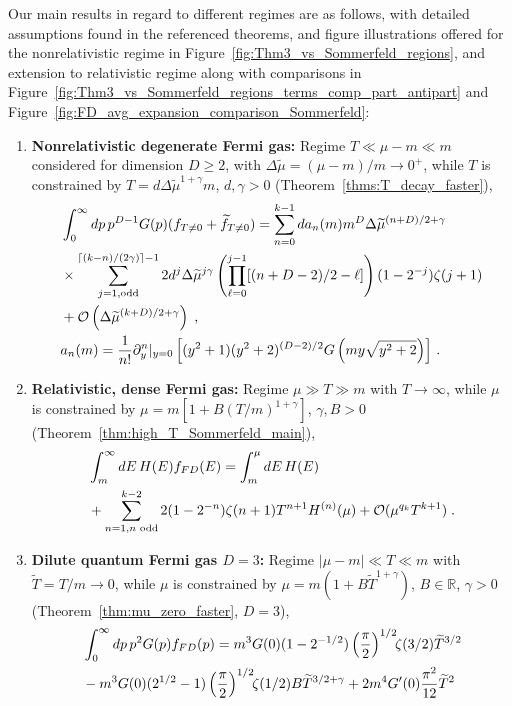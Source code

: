 \documentclass[sn-mathphys,Numbered]{sn-jnl}
\newcommand{\rf}[1]{Figure~{\ref{#1}}}
\newcommand{\rTh}[1]{Theorem~{\ref{#1}}}
\begin{document}
 Our main results in regard to different regimes are as follows, with detailed assumptions found in the referenced theorems, and figure illustrations offered for the nonrelativistic regime in \rf{fig:Thm3_vs_Sommerfeld_regions},  and extension to relativistic regime along with comparisons in \rf{fig:Thm3_vs_Sommerfeld_regions_terms_comp_part_antipart} and \rf{fig:FD_avg_expansion_comparison_Sommerfeld}:
\begin{enumerate}
\item 
{\bf Nonrelativistic degenerate Fermi gas:} Regime $T\ll\mu-m\ll m$ considered for dimension $D\geq 2$, with  $\Delta\widetilde{\mu}=(\mu-m)/m\to 0^+$, while $T$ is constrained by   $T=d\Delta\widetilde{\mu}^{1+\gamma}m$,  $d,\gamma>0$ (\rTh{thms:T_decay_faster}),
\begin{align}
 &\int_0^\infty dp\, p^{D-1} G(p)(f_{T\neq 0}+\widetilde{f}_{T\neq 0})=\sum_{n=0}^{k-1} da_n(m)m^{D}\Delta\widetilde{\mu}^{(n+D)/2+\gamma}\\
 &\times\sum_{j=1,\mathrm{odd}}^{\lceil(k-n)/(2\gamma)\rceil-1}
 2d^j\Delta\widetilde{\mu}^{j\gamma}\left(\prod_{\ell=0}^{j-1}[(n+D-2)/2-\ell] \right)(1-2^{-j})\zeta(j+1) \notag\\
 &+\mathcal{O}\left(\Delta\widetilde{\mu}^{(k+D)/2+\gamma}\right)\;,\notag\\
&a_n(m)=\frac{1}{n!}\partial_y^n|_{y=0}\left[ (y^2+1)( y^2+2)^{(D-2)/2} G\left(my\sqrt{y^2+2}\right)\right]\,.
\end{align}
\item  
{\bf Relativistic, dense Fermi gas:} Regime $\mu\gg T\gg m$ with  $T\to\infty$, while $\mu$ is constrained by $\mu=m[1+B(T/m)^{1+\gamma}]$, $\gamma,B>0$ (\rTh{thm:high_T_Sommerfeld_main}),
\begin{align}
 &\int_m^\infty dE\, H(E)f_{FD}(E)=\int_m^\mu dE\, H(E)\\
&+\sum_{n=1,n\text{ odd}}^{k-2} 2(1-2^{-n})\zeta(n+1)T^{n+1}H^{(n)}(\mu)+\mathcal{O}(\mu^{q_k}T^{k+1})\;.\notag
\end{align} 
\item  
{\bf Dilute quantum  Fermi gas $D=3$:} Regime $|\mu-m|\ll T\ll m$ with $\widetilde T=T/m\to 0$, while $\mu$ is constrained by  $\mu=m(1+B\widetilde{T}^{1+\gamma})$, $B\in\mathbb{R}$, $\gamma>0$ (\rTh{thm:mu_zero_faster}, $D=3$),
\begin{align}
&\int_0^\infty dp\, p^{2} G(p) f_{FD}(p) =m^{3}G(0)(1 - 2^{-1/2}) \left(\frac{\pi}{2}\right)^{1/2} \!\!\zeta(3/2)\widetilde{T}^{3/2}\label{eq:thm5_D3_conc}\\
 &- m^{3}G(0)({2}^{1/2}-1)\left(\frac{\pi}{2}\right)^{1/2}\!\!\zeta(1/2)B\widetilde{T}^{3/2+\gamma} +2m^{4}G^\prime(0) \frac{\pi^2}{12}\widetilde{T}^{2}\notag\\

\end{align}
\end{enumerate}
\end{document}
